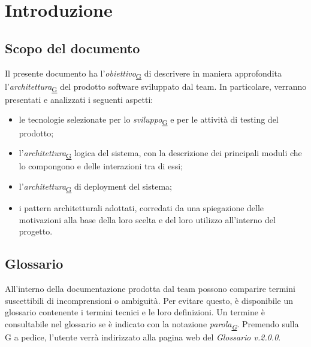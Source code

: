 \documentclass[a4paper,12pt]{article}
\begin{document}
\newpage

\tableofcontents





\newpage
\section{Introduzione}

    \subsection{Scopo del documento}
        Il presente documento ha l'\textit{obiettivo}\textsubscript{\href{https://atlasteam9.github.io/Atlas/glossario.html\#Obiettivo}{G}} di descrivere in maniera approfondita l'\textit{architettura}\textsubscript{\href{https://atlasteam9.github.io/Atlas/glossario.html\#Architettura}{G}} del prodotto software sviluppato dal team.
        In particolare, verranno presentati e analizzati i seguenti aspetti:
        \begin{itemize}
            \item le tecnologie selezionate per lo \textit{sviluppo}\textsubscript{\href{https://atlasteam9.github.io/Atlas/glossario.html\#Sviluppo}{G}} e per le attività di testing del prodotto;
            \item l'\textit{architettura}\textsubscript{\href{https://atlasteam9.github.io/Atlas/glossario.html\#Architettura}{G}} logica del sistema, con la descrizione dei principali moduli che lo compongono e delle interazioni tra di essi;
            \item l'\textit{architettura}\textsubscript{\href{https://atlasteam9.github.io/Atlas/glossario.html\#Architettura}{G}} di deployment del sistema;
            \item i pattern architetturali adottati, corredati da una spiegazione delle motivazioni alla base della loro scelta e del loro utilizzo all'interno del progetto.
        \end{itemize}
        
    \subsection{Glossario}
        All'interno della documentazione prodotta dal team possono comparire termini suscettibili di incomprensioni o ambiguità. Per evitare questo, è disponibile un glossario
        contenente i termini tecnici e le loro definizioni. Un termine è consultabile nel glossario se è indicato con la notazione \textit{parola\textsubscript{\href{https://atlasteam9.github.io/Atlas/glossario.html}{G}}}.
        Premendo sulla G a pedice, l'utente verrà indirizzato alla pagina web del \textit{Glossario v.2.0.0}.
    
\end{document}
